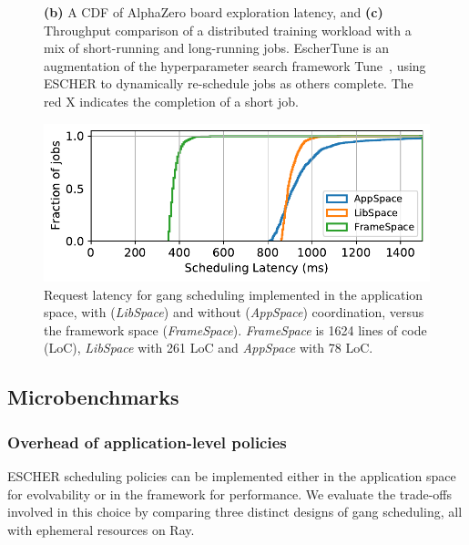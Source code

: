 \begin{figure}[t]
{%
\textbf{(b)} A CDF of AlphaZero board exploration latency, and
\textbf{(c)} Throughput comparison of a distributed training workload with a mix of short-running and long-running jobs. EscherTune is an augmentation of the hyperparameter search framework Tune~\cite{liaw2018tune}, using ESCHER to dynamically re-schedule jobs as others complete. %
The red X indicates the completion of a short job. %
}
\label{fig:alphazerolatencyfigure}
\vspace{-2mm}
\end{figure}


\begin{figure}[t]
\includegraphics[width=0.92\columnwidth]{escher/plots/result_gangsched_design_compare.pdf}
\caption{\small Request latency for gang scheduling implemented in the application space, with (\textit{LibSpace}) and without (\textit{AppSpace}) coordination, versus the framework space (\textit{FrameSpace}). \textit{FrameSpace} is 1624 lines of code (LoC), \textit{LibSpace} with 261 LoC and \textit{AppSpace} with 78 LoC.}
\label{fig:gangscheddesign-results}
\end{figure}

\subsection{Microbenchmarks}
\subsubsection{Overhead of application-level policies}
\label{sec:eval:gangscheduling}
ESCHER scheduling policies can be implemented either in the application space for evolvability or in the framework for performance.
We evaluate the trade-offs involved in this choice by comparing three distinct designs of gang scheduling, all with ephemeral resources on Ray.

